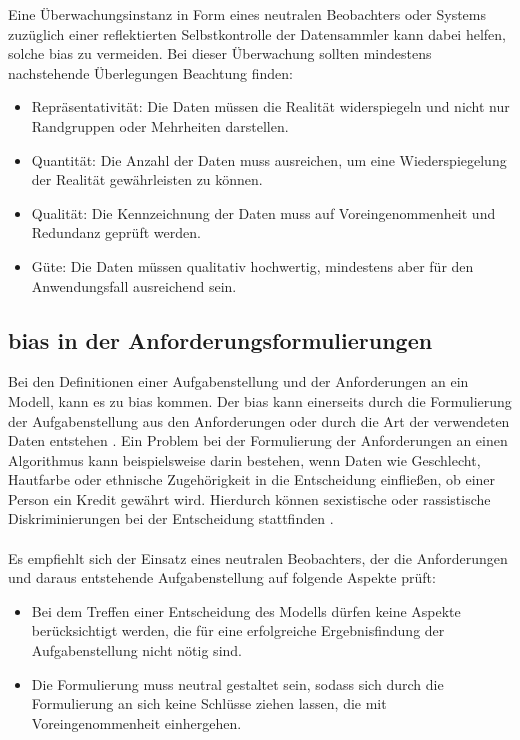 \documentclass[hidelinks,12pt]{report}
\begin{document}
\newpage

Eine Überwachungsinstanz in Form eines neutralen Beobachters oder Systems zuzüglich einer reflektierten Selbstkontrolle der Datensammler kann dabei helfen, solche \Gls{bias}  zu vermeiden. Bei dieser Überwachung sollten mindestens nachstehende Überlegungen Beachtung finden: 
\\
\begin{itemize}
	\item Repräsentativität: Die Daten müssen die Realität widerspiegeln und nicht nur Randgruppen oder Mehrheiten darstellen.
	\item Quantität: Die Anzahl der Daten muss ausreichen,  um eine Wiederspiegelung der Realität gewährleisten zu können.
	\item Qualität: Die Kennzeichnung der Daten muss auf Voreingenommenheit und Redundanz geprüft werden.
	\item Güte: Die Daten müssen qualitativ hochwertig, mindestens aber für den Anwendungsfall ausreichend sein.
\end{itemize}

\subsection{\Gls{bias}  in der Anforderungsformulierungen}
Bei den Definitionen einer Aufgabenstellung und der Anforderungen an ein Modell, kann es zu \Gls{bias}  kommen. Der \Gls{bias} kann einerseits durch die Formulierung der Aufgabenstellung aus den Anforderungen oder durch die Art der verwendeten Daten entstehen \cite[S. 51f.]{Srinivasan}. Ein Problem bei der Formulierung der Anforderungen an einen Algorithmus kann beispielsweise darin bestehen, wenn Daten wie Geschlecht, Hautfarbe oder ethnische Zugehörigkeit in die Entscheidung einfließen, ob einer Person ein Kredit gewährt wird. Hierdurch können sexistische oder rassistische Diskriminierungen bei der Entscheidung stattfinden \cite[S. 51f.]{Srinivasan}.
\\\\
Es empfiehlt sich der Einsatz eines neutralen Beobachters, der die Anforderungen und daraus entstehende Aufgabenstellung auf folgende Aspekte prüft: \\%
\begin{itemize}
    \item Bei dem Treffen einer Entscheidung des Modells dürfen keine Aspekte berücksichtigt werden, die für eine erfolgreiche Ergebnisfindung der Aufgabenstellung nicht nötig sind.
    \item Die Formulierung muss neutral gestaltet sein, sodass sich durch die Formulierung an sich keine Schlüsse ziehen lassen, die mit Voreingenommenheit einhergehen.
\end{itemize}
\end{document}
